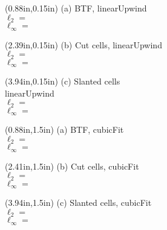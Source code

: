 \documentclass{article}
\begin{document}
\begin{textblock*}{12em}(0.88in,0.15in)
\footnotesize
(a) BTF, linearUpwind \\
\hspace*{0.2em}$\ell_2 = $ \\
\hspace*{0.2em}$\ell_\infty = $
\end{textblock*}
\begin{textblock*}{12em}(2.39in,0.15in)
\footnotesize
(b) Cut cells, linearUpwind \\
\hspace*{0.2em}$\ell_2 = $ \\
\hspace*{0.2em}$\ell_\infty = $
\end{textblock*}
\begin{textblock*}{12em}(3.94in,0.15in)
\footnotesize
(c) Slanted cells \\
linearUpwind \\
\hspace*{0.2em}$\ell_2 = $ \\
\hspace*{0.2em}$\ell_\infty = $
\end{textblock*}
\begin{textblock*}{12em}(0.88in,1.5in)
\footnotesize
(a) BTF, cubicFit \\
\hspace*{0.2em}$\ell_2 = $ \\
\hspace*{0.2em}$\ell_\infty = $
\end{textblock*}
\begin{textblock*}{12em}(2.41in,1.5in)
\footnotesize
(b) Cut cells, cubicFit \\
\hspace*{0.2em}$\ell_2 = $ \\
\hspace*{0.2em}$\ell_\infty = $
\end{textblock*}
\begin{textblock*}{12em}(3.94in,1.5in)
\footnotesize
(c) Slanted cells, cubicFit \\
\hspace*{0.2em}$\ell_2 = $ \\
\hspace*{0.2em}$\ell_\infty = $
\end{textblock*}
\end{document}
